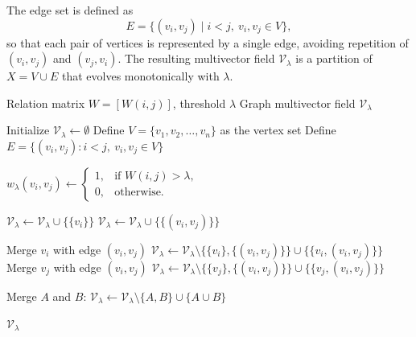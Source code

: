 \documentclass{article}
\theoremstyle{definition}
\theoremstyle{plain}
\theoremstyle{remark}
\newcommand{\1}{\mathbbm{1}}  %
\begin{document}
The edge set is defined as
\[
E = \{ (v_i,v_j) \mid i < j,\ v_i,v_j \in V \},
\]
so that each pair of vertices is represented by a single edge, avoiding
repetition of $(v_i,v_j)$ and $(v_j,v_i)$.  
The resulting multivector field $\mathcal V_\lambda$ is a partition of
$X = V \cup E$ that evolves monotonically with $\lambda$.








\begin{algorithm}
\caption{Construction of the Graph Multivector Field from a Relation Matrix}
\label{alg:graph-multivector-field}
\begin{algorithmic}[1]
\Require Relation matrix \( W = [W(i,j)] \), threshold \( \lambda \)
\Ensure Graph multivector field \( \mathcal{V}_\lambda \)

\State Initialize \( \mathcal{V}_\lambda \gets \emptyset \) 
\State Define \( V = \{v_1, v_2, \dots, v_n\} \) as the vertex set
\State Define \( E = \{(v_i,v_j) : i < j,\ v_i,v_j \in V\} \) 

    \State \( w_\lambda(v_i,v_j) \gets 
            \begin{cases}
            1, & \text{if } W(i,j) > \lambda,\\
            0, & \text{otherwise.}
            \end{cases} \)
\EndFor

    \State \( \mathcal{V}_\lambda \gets \mathcal{V}_\lambda \cup \{\{v_i\}\} \)
\EndFor
{}
    \State \( \mathcal{V}_\lambda \gets \mathcal{V}_\lambda \cup \{\{(v_i,v_j)\}\} \)
\EndFor

        \State Merge \( v_i \) with edge \( (v_i,v_j) \)
        \State \( \mathcal{V}_\lambda \gets 
            \mathcal{V}_\lambda \setminus \{\{v_i\}, \{(v_i,v_j)\}\} 
            \cup \{\{v_i,(v_i,v_j)\}\} \)
    \EndIf
        \State Merge \( v_j \) with edge \( (v_i,v_j) \)
        \State \( \mathcal{V}_\lambda \gets 
            \mathcal{V}_\lambda \setminus \{\{v_j\}, \{(v_i,v_j)\}\} 
            \cup \{\{v_j,(v_i,v_j)\}\} \)
    \EndIf
\EndFor

        \State Merge \( A \) and \( B \): 
            \( \mathcal{V}_\lambda \gets 
              \mathcal{V}_\lambda \setminus \{A,B\} 
              \cup \{A \cup B\} \)
    \EndIf
\EndFor

\State \Return \( \mathcal{V}_\lambda \) 
\end{algorithmic}
\end{algorithm}
\end{document}
